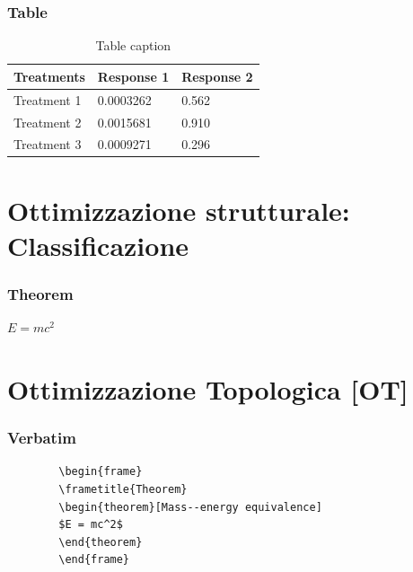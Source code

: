 \documentclass{beamer}
\begin{document}
\begin{frame}
	\frametitle{Table}
	\begin{table}
		\begin{tabular}{l l l}
			\toprule
			\textbf{Treatments} & \textbf{Response 1} & \textbf{Response 2}\\
			\midrule
			Treatment 1 & 0.0003262 & 0.562 \\
			Treatment 2 & 0.0015681 & 0.910 \\
			Treatment 3 & 0.0009271 & 0.296 \\
			\bottomrule
		\end{tabular}
		\caption{Table caption}
	\end{table}
\end{frame}





\section{Ottimizzazione strutturale: Classificazione}

\begin{frame}
	\frametitle{Theorem}
	\begin{theorem}
		$E = mc^2$
	\end{theorem}
\end{frame}


\section{Ottimizzazione Topologica [OT]}



\begin{frame}[fragile] %
	\frametitle{Verbatim}
	\begin{example}
		\begin{verbatim}
		\begin{frame}
		\frametitle{Theorem}
		\begin{theorem}[Mass--energy equivalence]
		$E = mc^2$
		\end{theorem}
		\end{frame}\end{verbatim}
	\end{example}
\end{frame}
\end{document}
